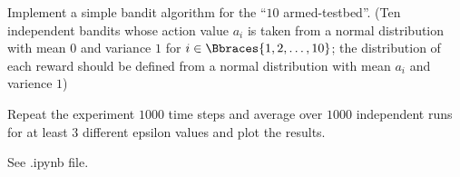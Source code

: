 \begin{exercise}
Implement a simple bandit algorithm for the \enquote{$10$ armed-testbed}.
(Ten independent bandits whose action value $a_i$ is taken from a normal distribution with mean $0$ and variance $1$ for $i \in \Bbraces{1, 2, \dots, 10}$; the distribution of each reward should be defined from a normal distribution with mean $a_i$ and varience $1$)

Repeat the experiment $1000$ time steps and average over $1000$ independent runs for at least $3$ different epsilon values and plot the results.

\end{exercise}

\begin{solution}
See .ipynb file.
\end{solution}
